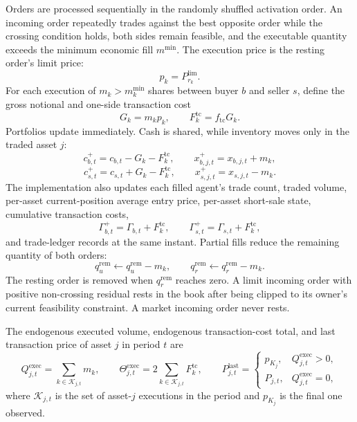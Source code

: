 \documentclass[12pt, a4paper]{article}
\begin{document}
    Orders are processed sequentially in the randomly shuffled activation order.
    An incoming order repeatedly trades against the best opposite order while the
    crossing condition holds, both sides remain feasible, and the executable
    quantity exceeds the minimum economic fill \(m^{\min}\). The execution price is
    the resting order's limit price:
    \[
        p_k=P_{r_k}^{\text{lim}}.
    \]
    For each execution of \(m_k>m_k^{\min}\) shares between buyer \(b\) and seller \(s\),
    define the gross notional and one-side transaction cost
    \[
        G_k=m_kp_k,
        \qquad
        F_k^{\mathrm{tc}}=f_{\mathrm{tc}}G_k.
    \]
    Portfolios update immediately. Cash is shared, while inventory moves only in
    the traded asset \(j\):
    \[
        c_{b,t}^{+}=c_{b,t}-G_k-F_k^{\mathrm{tc}},
        \qquad
        x_{b,j,t}^{+}=x_{b,j,t}+m_k,
    \]
    \[
        c_{s,t}^{+}=c_{s,t}+G_k-F_k^{\mathrm{tc}},
        \qquad
        x_{s,j,t}^{+}=x_{s,j,t}-m_k.
    \]
    The implementation also updates each filled agent's trade count, traded
    volume, per-asset current-position average entry price, per-asset short-sale
    state, cumulative transaction costs,
    \[
        \Gamma_{b,t}^{+}=\Gamma_{b,t}+F_k^{\mathrm{tc}},
        \qquad
        \Gamma_{s,t}^{+}=\Gamma_{s,t}+F_k^{\mathrm{tc}},
    \]
    and trade-ledger records at the same instant. Partial fills reduce the remaining quantity of
    both orders:
    \[
        q_{u}^{\mathrm{rem}}\leftarrow q_{u}^{\mathrm{rem}}-m_k,
        \qquad
        q_{r}^{\mathrm{rem}}\leftarrow q_{r}^{\mathrm{rem}}-m_k.
    \]
    The resting order is removed when \(q_{r}^{\mathrm{rem}}\) reaches zero. A
    limit incoming order with positive non-crossing residual rests in the book
    after being clipped to its owner's current feasibility constraint. A market
    incoming order never rests.

    The endogenous executed volume, endogenous transaction-cost total, and last
    transaction price of asset \(j\) in period \(t\) are
    \[
        Q_{j,t}^{\mathrm{exec}}=\sum_{k\in\mathcal{K}_{j,t}} m_k,
        \qquad
        \Theta_{j,t}^{\mathrm{exec}}=2\sum_{k\in\mathcal{K}_{j,t}} F_k^{\mathrm{tc}},
        \qquad
        P_{j,t}^{\mathrm{last}}=
        \begin{cases}
            p_{K_j}, & Q_{j,t}^{\mathrm{exec}}>0,\\
            P_{j,t}, & Q_{j,t}^{\mathrm{exec}}=0,
        \end{cases}
    \]
    where \(\mathcal{K}_{j,t}\) is the set of asset-\(j\) executions in the period
    and \(p_{K_j}\) is the final one observed.
\end{document}
